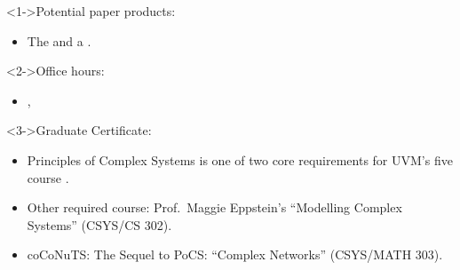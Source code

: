 \begin{frame}

  \begin{block}<1->{Potential paper products:}
    \begin{itemize}
    \item<1-> 
      The
      and a 
      .
    \end{itemize}
  \end{block}

  \begin{block}<2->{Office hours:}
    \begin{itemize}
    \item<2-> 
      \officehours, \\ \officelocation
    \end{itemize}
  \end{block}

  \begin{block}<3->{Graduate Certificate:}
    \begin{itemize}
    \item
      Principles of Complex Systems is one of two core requirements
      for UVM's five course
      .
    \item
     Other required course:  Prof.\ Maggie Eppstein's ``Modelling Complex Systems'' (CSYS/CS 302).
    \item
      coCoNuTS: The Sequel to PoCS: ``Complex Networks'' (CSYS/MATH 303).
    \end{itemize}
  \end{block}

\end{frame}


